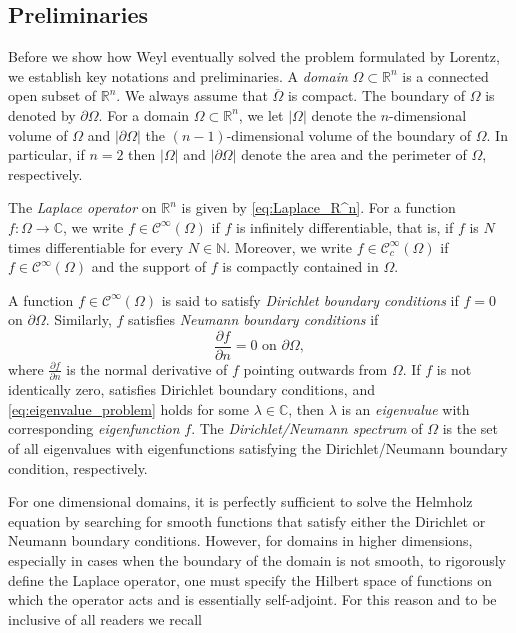 \documentclass{amsart}
\theoremstyle{definition}
\newcommand*{\R}{\mathbb{R}}
\newcommand*{\N}{\mathbb{N}}
\newcommand*{\C}{\mathbb{C}}
\begin{document}
\subsection{Preliminaries} 
Before we show how Weyl eventually solved the problem formulated by Lorentz, we establish key notations and preliminaries. A \textit{domain} $\Omega \subset \R^n$ is a connected open subset of $\R^n$. We always assume that $\overline{\Omega}$ is compact. The boundary of $\Omega$ is denoted by $\partial\Omega$. For a domain $\Omega \subset \R^n$, we let $|\Omega|$ denote the $n$-dimensional volume of $\Omega$ and $|\partial\Omega|$ the $(n-1)$-dimensional volume of the boundary of $\Omega$. In particular, if $n = 2$ then $|\Omega|$ and $|\partial\Omega|$ denote the area and the perimeter of $\Omega$, respectively.

The \textit{Laplace operator} on $\R^n$ is given by \eqref{eq:Laplace_R^n}.  For a function $f : \Omega \to \C$, we write $f \in \mathscr{C}^\infty(\Omega)$ if $f$ is infinitely differentiable, that is, if $f$ is $N$ times differentiable for every $N \in \N$. Moreover, we write $f \in \mathscr{C}_c^\infty(\Omega)$ if $f \in \mathscr{C}^\infty(\Omega)$ and the support of $f$ is compactly contained in $\Omega$. 

A function $f \in \mathscr{C}^\infty(\Omega)$ is said to satisfy \textit{Dirichlet boundary conditions} if $f = 0$ on $\partial\Omega$. Similarly, $f$ satisfies \textit{Neumann boundary conditions} if
    \begin{equation*}
        \frac{\partial f}{\partial n} = 0 \text{ on } \partial\Omega,
    \end{equation*}
where $\frac{\partial f}{\partial n}$ is the normal derivative of $f$ pointing outwards from $\Omega$. If $f$ is not identically zero, satisfies Dirichlet boundary conditions, and \eqref{eq:eigenvalue_problem} holds for some $\lambda \in \C$, then $\lambda$ is an \textit{eigenvalue} with corresponding \textit{eigenfunction} $f$. The \textit{Dirichlet/Neumann spectrum} of $\Omega$ is the set of all eigenvalues with eigenfunctions satisfying the Dirichlet/Neumann boundary condition, respectively.

For one dimensional domains, it is perfectly sufficient to solve the Helmholz equation by searching for smooth functions that satisfy either the Dirichlet or Neumann boundary conditions.  However, for domains in higher dimensions, especially in cases when the boundary of the domain is not smooth, to rigorously define the Laplace operator, one must specify the Hilbert space of functions on which the operator acts and is essentially self-adjoint. For this reason and to be inclusive of all readers we recall
\end{document}

